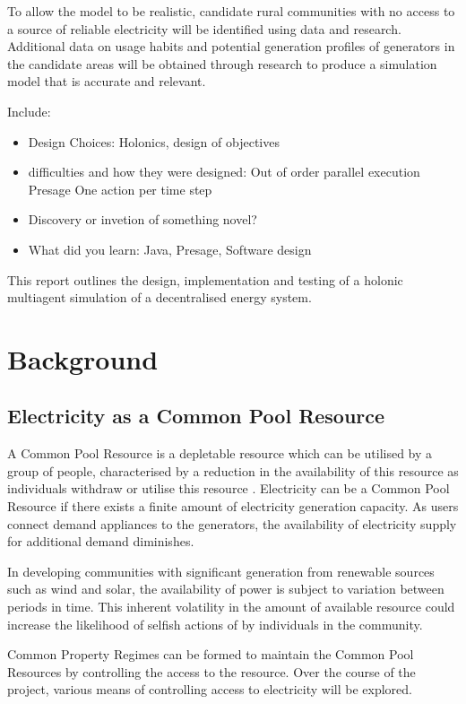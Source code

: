 \documentclass{article}
\begin{document}
To allow the model to be realistic, candidate rural communities with no access to a source of reliable electricity will be identified using data and research. Additional data on usage habits and potential generation profiles of generators in the candidate areas will be obtained through research to produce a simulation model that is accurate and relevant.

Include:
\begin{itemize}
\item Design Choices: Holonics, design of objectives
\item difficulties and how they were designed:
\subitem Out of order parallel execution
\subitem Presage
\subitem One action per time step
\item Discovery or invetion of something novel?
\item What did you learn:
\subitem Java, Presage, Software design
\end{itemize}


This report outlines the design, implementation and testing of a holonic multiagent simulation of a decentralised energy system. 

\section{Background}

\subsection{Electricity as a Common Pool Resource}
A Common Pool Resource is a depletable resource which can be utilised by a group of people, characterised by a reduction in the availability of this resource as individuals withdraw or utilise this resource \cite{Ostrom:90}.  Electricity can be a Common Pool Resource if there exists a finite amount of electricity generation capacity. As users connect demand appliances to the generators, the availability of electricity supply for additional demand diminishes.

In developing communities with significant generation from renewable sources such as wind and solar, the availability of power is subject to variation between periods in time. This inherent volatility in the amount of available resource could increase the likelihood of selfish actions of by individuals in the community.

Common Property Regimes can be formed to maintain the Common Pool Resources by controlling the access to the resource. Over the course of the project, various means of controlling access to electricity will be explored. 
\end{document}
